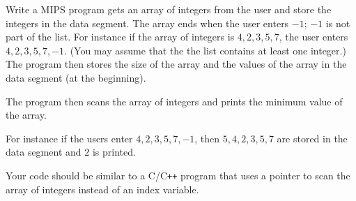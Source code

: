 

\renewcommand\AUTHOR{aoro1@cougars.ccis.edu} %


\topmattertwo

\nextq
Write a MIPS program gets an array of integers from the user and store
the integers in the data segment. 
The array ends when the user enters $-1$;
$-1$ is not part of the list.
For instance if the array of integers is $4, 2, 3, 5, 7$, the user enters
$4, 2, 3, 5, 7, -1$.
(You may assume that the the list contains at least one integer.)
The program then stores the size of the array
and the values of the array in the data segment (at the beginning).

The program then scans the array of integers and prints the minimum value
of the array.

For instance if the users enter $4, 2, 3, 5, 7, -1$, then
$5, 4, 2, 3, 5, 7$ are stored in the data segment and $2$ is printed.

Your code should be similar to a C/C\texttt{++} program that uses a
pointer to scan 
the array of integers instead of an index variable.

